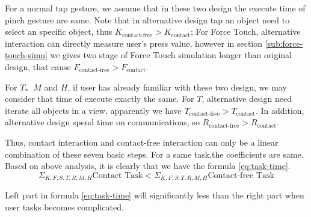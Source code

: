 For a normal tap gesture, we assume that in these two design the execute time of pinch gesture are same. Note that in alternative design tap an object need to select an specific object, thus $K_{\text{contact-free}}>K_{\text{contact}}$; For Force Touch, alternative interaction can directly measure user's press value, however in section \ref{sub:force-touch-simu} we gives two stage of Force Touch simulation longer than original design, that cause $F_{\text{contact-free}}>F_{\text{contact}}$.

For $T$、$M$ and $H$, if user has already familiar with these two design, we may consider that time of execute exactly the same. For $T$, alternative design need iterate all objects in a view, apparently we have $T_{\text{contact-free}}>T_{\text{contact}}$. In addition, alternative design spend time on communications, so $R_{\text{contact-free}}>R_{\text{contact}}$.

Thus, contact interaction and contact-free interaction can only be a linear combination of these seven basic steps. For a same task,the coefficients are same. Based on above analysis, it is clearly that we have the formula \ref{eq:task-time}.
\begin{equation}
    \label{eq:task-time}
    \Sigma_{K,F,S,T,R,M,H}{\text{Contact Task}} < \Sigma_{K,F,S,T,R,M,H}{\text{Contact-free Task}}
\end{equation}

Left part in formula \ref{eq:task-time}  will significantly less than the right part when user tasks becomes complicated.

